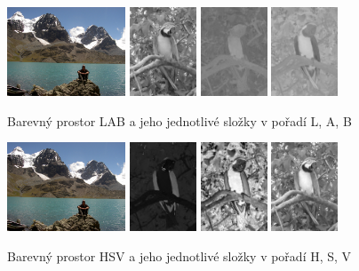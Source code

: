\documentclass[czech,BP]{thesiskiv}
\begin{document}
\begin{figure}[ht]
		\centering
		\includegraphics[height=100px]{./img/img_histogram.jpg}
		\includegraphics[height=100px]{./img/lab_l.jpg}
		\includegraphics[height=100px]{./img/lab_a.jpg}
		\includegraphics[height=100px]{./img/lab_b.jpg}	
		\caption{Barevný prostor LAB a jeho jednotlivé složky v pořadí L, A, B}
\end{figure}

\begin{figure}[ht]
		\centering
		\includegraphics[height=100px]{./img/img_histogram.jpg}
		\includegraphics[height=100px]{./img/hsv_h.jpg}
		\includegraphics[height=100px]{./img/hsv_s.jpg}
		\includegraphics[height=100px]{./img/hsv_v.jpg}	
		\caption{Barevný prostor HSV a jeho jednotlivé složky v pořadí H, S, V}
\end{figure}
\end{document}
